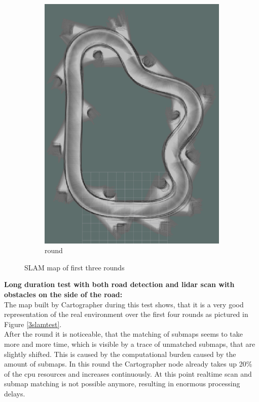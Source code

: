 \begin{figure}
\begin{subfigure}{.3\linewidth}
		\includegraphics[width=\textwidth]{Pictures/2slamtest3}
		\caption{ round}
	\end{subfigure}

	\caption{SLAM map of first three rounds}
	\label{2slamtest}

\end{figure}



\textbf{Long duration test with both road detection and lidar scan with obstacles on the side of the road:}\\

The map built by Cartographer during this test shows, that it is a very good representation of the real environment over the first four rounds as pictured in Figure \ref{3slamtest}.\\

After the  round it is noticeable, that the matching of submaps seems to take more and more time, which is visible by a trace of unmatched submaps, that are slightly shifted. This is caused by the computational burden caused by the amount of submaps. In this round the Cartographer node already takes up 20\% of the cpu resources and increases continuously. At this point realtime scan and submap matching is not possible anymore, resulting in enormous processing delays.

